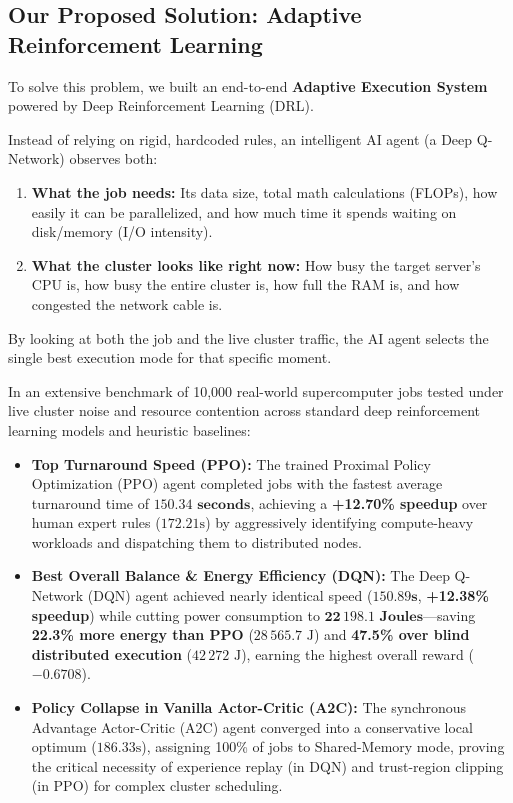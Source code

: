 \documentclass[11pt,a4paper]{article}
\begin{document}
\subsection{Our Proposed Solution: Adaptive Reinforcement Learning}
To solve this problem, we built an end-to-end \textbf{Adaptive Execution System} powered by Deep Reinforcement Learning (DRL). 

Instead of relying on rigid, hardcoded rules, an intelligent AI agent (a Deep Q-Network) observes both:
\begin{enumerate}[noitemsep, topsep=1pt]
    \item \textbf{What the job needs:} Its data size, total math calculations (FLOPs), how easily it can be parallelized, and how much time it spends waiting on disk/memory (I/O intensity).
    \item \textbf{What the cluster looks like right now:} How busy the target server's CPU is, how busy the entire cluster is, how full the RAM is, and how congested the network cable is.
\end{enumerate}

By looking at both the job and the live cluster traffic, the AI agent selects the single best execution mode for that specific moment.

\begin{tcolorbox}[insightbox, title={Key Empirical Results (10,000-Job Multi-Model Benchmark)}]
In an extensive benchmark of 10,000 real-world supercomputer jobs tested under live cluster noise and resource contention across standard deep reinforcement learning models and heuristic baselines:
\begin{itemize}[noitemsep, topsep=0pt]
    \item \textbf{Top Turnaround Speed (PPO):} The trained Proximal Policy Optimization (PPO) agent completed jobs with the fastest average turnaround time of $\mathbf{150.34\text{ seconds}}$, achieving a \textbf{+12.70\% speedup} over human expert rules ($172.21\text{s}$) by aggressively identifying compute-heavy workloads and dispatching them to distributed nodes.
    \item \textbf{Best Overall Balance \& Energy Efficiency (DQN):} The Deep Q-Network (DQN) agent achieved nearly identical speed ($\mathbf{150.89\text{s}}$, \textbf{+12.38\% speedup}) while cutting power consumption to $\mathbf{22\,198.1\text{ Joules}}$—saving \textbf{22.3\% more energy than PPO} ($28\,565.7\text{ J}$) and \textbf{47.5\% over blind distributed execution} ($42\,272\text{ J}$), earning the highest overall reward ($\mathbf{-0.6708}$).
    \item \textbf{Policy Collapse in Vanilla Actor-Critic (A2C):} The synchronous Advantage Actor-Critic (A2C) agent converged into a conservative local optimum ($186.33\text{s}$), assigning 100\% of jobs to Shared-Memory mode, proving the critical necessity of experience replay (in DQN) and trust-region clipping (in PPO) for complex cluster scheduling.
\end{itemize}
\end{tcolorbox}
\end{document}
